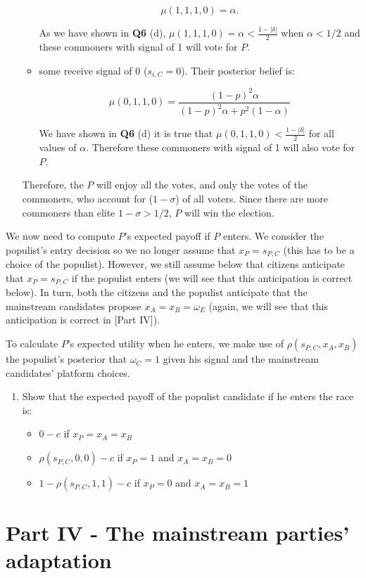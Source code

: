 \documentclass[
  letterpaper,
  abstract=true]{scrartcl}
\providecommand{\tightlist}{%
  \setlength{\itemsep}{0pt}\setlength{\parskip}{0pt}}\usepackage{longtable,booktabs,array}
\begin{document}
\begin{enumerate}
\begin{itemize}
    \[
    \mu(1,1,1,0)=\alpha.
    \]

    As we have shown in \textbf{Q6} (d),
    \(\mu(1,1,1,0)=\alpha<\frac{1-|\delta|}{2}\) when \(\alpha<1/2\) and
    these commoners with signal of 1 will vote for \(P\).
  \item
    some receive signal of 0 (\(s_{i,C}=0\)). Their posterior belief is:

    \[
    \mu(0,1,1,0)=\frac{(1-p)^2\alpha}{(1-p)^2\alpha+p^2(1-\alpha)}
    \]

    We have shown in \textbf{Q6} (d) it is true that
    \(\mu(0,1,1,0)<\frac{1-|\delta|}{2}\) for all values of \(\alpha\).
    Therefore these commoners with signal of 1 will also vote for \(P\).
  \end{itemize}

  Therefore, the \(P\) will enjoy all the votes, and only the votes of
  the commoners, who account for (\(1-\sigma\)) of all voters. Since
  there are more commoners than elite \(1-\sigma>1/2\), \(P\) will win
  the election.
\end{enumerate}

We now need to compute \(P\)'s expected payoff if \(P\) enters. We
consider the populist's entry decision so we no longer assume that
\(x_P = s_{P,C}\) (this has to be a choice of the populist). However, we
still assume below that citizens anticipate that \(x_P = s_{P,C}\) if
the populist enters (we will see that this anticipation is correct
below). In turn, both the citizens and the populist anticipate that the
mainstream candidates propose \(x_A=x_B=\omega_E\) (again, we will see
that this anticipation is correct in {[}Part IV{]}).

To calculate \(P\)'s expected utility when he enters, we make use of
\(\rho(s_{P,C}, x_A, x_B)\) the populist's posterior that
\(\omega_C = 1\) given his signal and the mainstream candidates'
platform choices.

\begin{enumerate}
\def\labelenumi{(\alph{enumi})}
\setcounter{enumi}{2}
\tightlist
\item
  Show that the expected payoff of the populist candidate if he enters
  the race is:

  \begin{itemize}
  \item
    \(0 − c\) if \(x_P = x_A = x_B\)

    \color{blue}

    \color{black}
  \item
    \(\rho(s_{P,C}, 0, 0) − c\) if \(x_P = 1\) and \(x_A = x_B = 0\)
  \item
    \(1 − \rho(s_{P,C}, 1, 1) − c\) if \(x_P = 0\) and \(x_A = x_B = 1\)
  \end{itemize}
\end{enumerate}

\hypertarget{part-iv---the-mainstream-parties-adaptation}{%
\section{Part IV - The mainstream parties'
adaptation}\label{part-iv---the-mainstream-parties-adaptation}}
\end{document}
